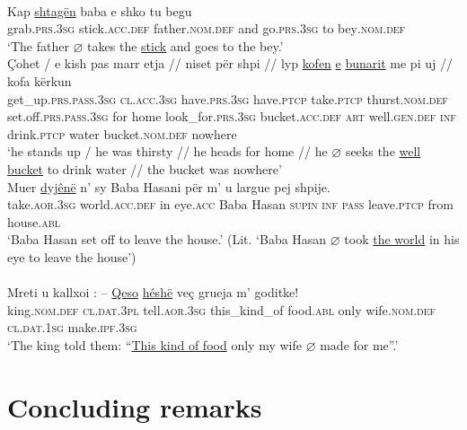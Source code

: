 \documentclass[output=paper]{langsci/langscibook}
\begin{document}
\ea \label{example26matoshi} 
	\\
	\gll Kap \uline{shtagën} baba e shko tu begu\\
	grab.\textsc{prs.3sg} stick\textsc{.acc.def} father.\textsc{nom.def} and go.\textsc{prs.3sg} to bey\textsc{.nom.def}\\
	\glt ‘The father $\varnothing$ takes the \uline{stick} and goes to the bey.’
\ex \label{example27matoshi} 
	\\
	\gll Çohet / e kish pas marr etja // niset për shpi // lyp \uline{kofen} \uline{e} \uline{bunarit} me pi uj // kofa kërkun\\
	get\_up\textsc{.prs.pass.3sg} {} \textsc{cl.acc.3sg} have\textsc{.prs.3sg} have\textsc{.ptcp} take\textsc{.ptcp} thurst.\textsc{nom.def} {} set.off\textsc{.prs.pass.3sg} for home {} look\_for.\textsc{prs.3sg} bucket.\textsc{acc.def} \textsc{art} well.\textsc{gen.def} \textsc{inf} drink\textsc{.ptcp} water {} bucket.\textsc{nom.def} nowhere\\
	\glt ‘he stands up / he was thirsty // he heads for home // he $\varnothing$ seeks the \uline{well bucket} to drink water // the bucket was nowhere’
\ex \label{example28matoshi} 
	\\
	\gll Muer \uline{dyjênë} n’ sy Baba Hasani për m’ u largue pej shpije.\\
	take\textsc{.aor.3sg} world\textsc{.acc.def} in eye.\textsc{acc} Baba Hasan \textsc{supin} \textsc{inf} \textsc{pass} leave.\textsc{ptcp} from house\textsc{.abl}\\
	\glt ‘Baba Hasan set off to leave the house.’ (Lit. ‘Baba Hasan $\varnothing$ took \uline{the world} in his eye to leave the house’)\\	
\ex \label{example29matoshi} 
	\\
	\gll Mreti u kallxoi : – \uline{Qeso} \uline{héshë} veç grueja m’ goditke!\\
	king.\textsc{nom.def} \textsc{cl.dat.3pl} tell\textsc{.aor.3sg} {} {} this\_kind\_of food\textsc{.abl} only wife\textsc{.nom.def} \textsc{cl.dat.1sg} make.\textsc{ipf.3sg}\\
	\glt ‘The king told them: \enquote{\uline{This kind of food} only my wife $\varnothing$ made for me}.’
 \z

\section{Concluding remarks}
\end{document}
